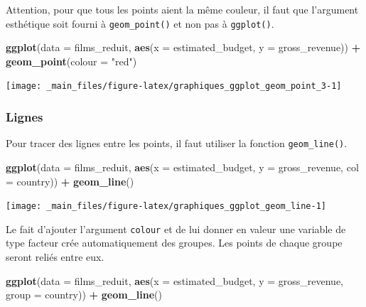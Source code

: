 \documentclass[
  11pt,
]{book}
\newenvironment{Shaded}{\begin{snugshade}}{\end{snugshade}}
\newcommand{\DataTypeTok}[1]{\textcolor[rgb]{0.13,0.29,0.53}{#1}}
\newcommand{\KeywordTok}[1]{\textcolor[rgb]{0.13,0.29,0.53}{\textbf{#1}}}
\newcommand{\NormalTok}[1]{#1}
\newcommand{\OperatorTok}[1]{\textcolor[rgb]{0.81,0.36,0.00}{\textbf{#1}}}
\newcommand{\StringTok}[1]{\textcolor[rgb]{0.31,0.60,0.02}{#1}}
\numberwithin{equation}{section}
\numberwithin{countremarque}{section}
\begin{document}
Attention, pour que tous les points aient la même couleur, il faut que l'argument esthétique soit fourni à \texttt{geom\_point()} et non pas à \texttt{ggplot()}.

\begin{Shaded}
\begin{Highlighting}[]
\KeywordTok{ggplot}\NormalTok{(}\DataTypeTok{data =}\NormalTok{ films\_reduit,}
       \KeywordTok{aes}\NormalTok{(}\DataTypeTok{x =}\NormalTok{ estimated\_budget, }\DataTypeTok{y =}\NormalTok{ gross\_revenue)) }\OperatorTok{+}
\StringTok{  }\KeywordTok{geom\_point}\NormalTok{(}\DataTypeTok{colour =} \StringTok{"red"}\NormalTok{)}
\end{Highlighting}
\end{Shaded}

\begin{center}\texttt{[image: \_main\_files/figure-latex/graphiques\_ggplot\_geom\_point\_3-1]} \end{center}

\hypertarget{graphiques_ggplot_geom_line}{%
\subsubsection{Lignes}\label{graphiques_ggplot_geom_line}}

Pour tracer des lignes entre les points, il faut utiliser la fonction \texttt{geom\_line()}.

\begin{Shaded}
\begin{Highlighting}[]
\KeywordTok{ggplot}\NormalTok{(}\DataTypeTok{data =}\NormalTok{ films\_reduit,}
       \KeywordTok{aes}\NormalTok{(}\DataTypeTok{x =}\NormalTok{ estimated\_budget,}
           \DataTypeTok{y =}\NormalTok{ gross\_revenue, }\DataTypeTok{col =}\NormalTok{ country)) }\OperatorTok{+}
\StringTok{  }\KeywordTok{geom\_line}\NormalTok{()}
\end{Highlighting}
\end{Shaded}

\begin{center}\texttt{[image: \_main\_files/figure-latex/graphiques\_ggplot\_geom\_line-1]} \end{center}

Le fait d'ajouter l'argument \texttt{colour} et de lui donner en valeur une variable de type facteur crée automatiquement des groupes. Les points de chaque groupe seront reliés entre eux.

\begin{Shaded}
\begin{Highlighting}[]
\KeywordTok{ggplot}\NormalTok{(}\DataTypeTok{data =}\NormalTok{ films\_reduit,}
       \KeywordTok{aes}\NormalTok{(}\DataTypeTok{x =}\NormalTok{ estimated\_budget,}
           \DataTypeTok{y =}\NormalTok{ gross\_revenue, }\DataTypeTok{group =}\NormalTok{ country)) }\OperatorTok{+}
\StringTok{  }\KeywordTok{geom\_line}\NormalTok{()}
\end{Highlighting}
\end{Shaded}
\end{document}
